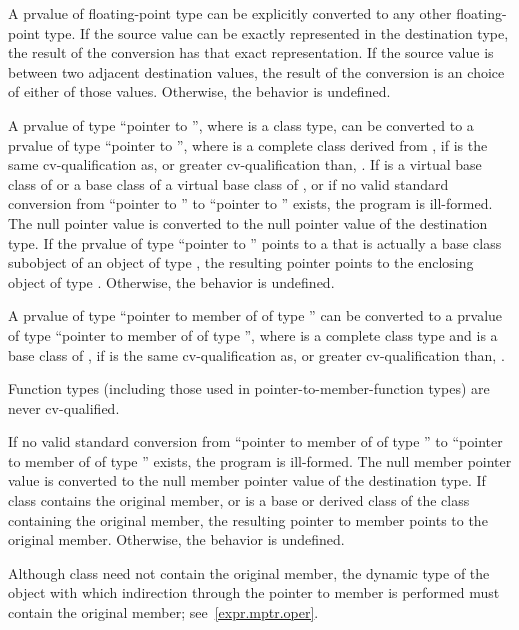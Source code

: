 \pnum
A prvalue of floating-point type can be explicitly converted to
any other floating-point type.
If the source value can be exactly represented in the destination type,
the result of the conversion has that exact representation.
If the source value is between two adjacent destination values,
the result of the conversion is
an  choice of
either of those values.
Otherwise, the behavior is undefined.

\pnum
{}%
%
A prvalue of type ``pointer to  '', where 
is a class type, can be converted to a prvalue of type ``pointer to
 '',
where  is a complete class derived
from ,
if  is the same cv-qualification as,
or greater cv-qualification than, .
If  is a virtual base class of  or
a base class of a virtual base class of , or
if no valid standard conversion from ``pointer to ''
to ``pointer to '' exists, the program is ill-formed.
The null pointer value is converted
to the null pointer value of the destination type. If the prvalue of type
``pointer to  '' points to a  that is
actually a base class subobject of an object of type , the resulting
pointer points to the enclosing object of type . Otherwise, the
behavior is undefined.

\pnum
{}%
A prvalue of type ``pointer to member of  of type 
'' can be converted to a prvalue of type ``pointer to member of
 of type  '', where
 is a complete class type and
 is a base class of ,
if  is the same cv-qualification
as, or greater cv-qualification than, .
\begin{note}
Function types (including those used in pointer-to-member-function types)
are never cv-qualified.
\end{note}
If no valid standard conversion
from ``pointer to member of  of type ''
to ``pointer to member of  of type ''
exists, the program is ill-formed.
The null member pointer value is converted to the null
member pointer value of the destination type. If class 
contains the original member, or is a base or derived class of the class
containing the original member, the resulting pointer to member points
to the original member. Otherwise, the behavior is undefined.
\begin{note}
Although class  need not contain the original member, the
dynamic type of the object with which indirection through the pointer
to member is performed must contain the original member;
see~\ref{expr.mptr.oper}.
\end{note}

